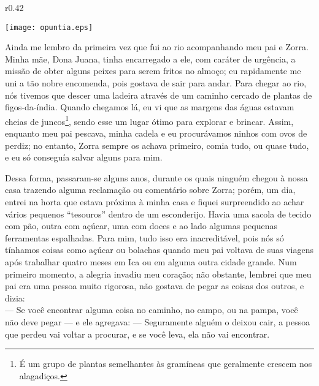 \ifdefined\EnableIncludeImages
\begin{wrapfigure}{r}{0.42\textwidth}
  \begin{center}
  \vspace{-30pt}
    \texttt{[image: opuntia.eps]}
  \end{center}
  \vspace{-20pt}
\end{wrapfigure}
\fi
Ainda me lembro da primeira vez que fui ao rio acompanhando meu pai e Zorra. Minha mãe, Dona Juana, tinha encarregado a ele, com caráter de urgência, a missão de obter alguns peixes para serem fritos no almoço; eu rapidamente me uni a tão nobre encomenda, pois gostava de sair para andar. 
Para chegar ao rio, nós tivemos que descer uma ladeira através de um caminho cercado de plantas de figos-da-índia. Quando chegamos lá, eu vi que as margens das águas estavam cheias de juncos\footnote{É um grupo de plantas semelhantes às gramíneas que geralmente crescem nos alagadiços.}, sendo esse um lugar ótimo para explorar e brincar. Assim, enquanto meu pai pescava, minha cadela e eu procurávamos ninhos com ovos de perdiz; no entanto, Zorra sempre os achava primeiro, comia tudo, ou quase tudo, e eu só conseguía salvar alguns para mim.


Dessa forma, passaram-se alguns anos, durante os quais ninguém chegou à nossa casa trazendo alguma reclamação ou comentário sobre Zorra; porém, um dia, entrei na horta que estava próxima à minha casa e fiquei surpreendido ao achar vários pequenos ``tesouros'' dentro de um esconderijo. Havia uma sacola de tecido com pão, outra com açúcar, uma com doces e ao lado algumas pequenas ferramentas espalhadas. 
Para mim, tudo isso era inacreditável, pois nós só tínhamos coisas como açúcar ou bolachas quando meu pai voltava de suas viagens após trabalhar quatro meses em Ica ou em alguma outra cidade grande.
Num primeiro momento, a alegria invadiu meu coração; não obstante, lembrei que meu pai era uma pessoa muito rigorosa, não gostava de pegar as coisas dos outros, e dizia:\\\indent
--- Se você encontrar alguma coisa no caminho, no campo, ou na pampa, você não deve pegar ---
e ele agregava:
--- Seguramente alguém o deixou cair, a pessoa que perdeu vai voltar a procurar, e se você leva, ela não vai encontrar.

